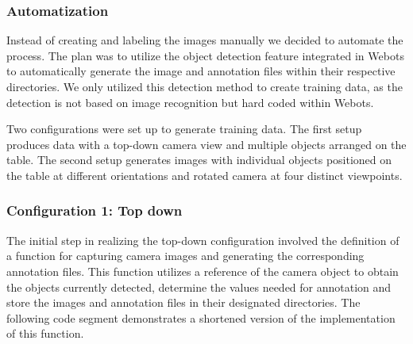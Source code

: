 \subsubsection{Automatization}

Instead of creating and labeling the images manually we decided to automate the process. The plan was to utilize the object detection feature integrated in Webots to automatically generate the image and annotation files within their respective directories. We only utilized this detection method to create training data, as the detection is not based on image recognition but hard coded within Webots. 

Two configurations were set up to generate training data. The first setup produces data with a top-down camera view and multiple objects arranged on the table. The second setup generates images with individual objects positioned on the table at different orientations and rotated camera at four distinct viewpoints.

\subsubsection{Configuration 1: Top down}

The initial step in realizing the top-down configuration involved the definition of a function for capturing camera images and generating the corresponding annotation files. This function utilizes a reference of the camera object to obtain the objects currently detected, determine the values needed for annotation and store the images and annotation files in their designated directories. The following code segment demonstrates a shortened version of the implementation of this function.

